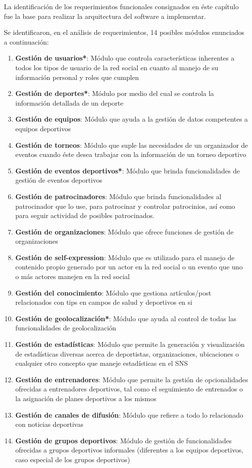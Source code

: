 La identificación de los requerimientos funcionales consignados en éste capítulo fue la base para realizar la arquitectura del software a implementar.

Se identificaron, en el análisis de requerimientos, 14 posibles módulos enunciados a continuación:

\begin{enumerate}
	\item \textbf{Gestión de usuarios*}: Módulo que controla características inherentes a todos los tipos de usuario de la red social en cuanto al manejo de su información personal y roles que cumplen
	\item \textbf{Gestión de deportes*}: Módulo por medio del cual se controla la información detallada de un deporte
	\item \textbf{Gestión de equipos}: Módulo que ayuda a la gestión de datos competentes a equipos deportivos
	\item \textbf{Gestión de torneos}: Módulo que suple las necesidades de un organizador de eventos cuando éste desea trabajar con la información de un torneo deportivo
	\item \textbf{Gestión de eventos deportivos*}: Módulo que brinda funcionalidades de gestión de eventos deportivos
	\item \textbf{Gestión de patrocinadores}: Módulo que brinda funcionalidades al patrocinador que lo use, para patrocinar y controlar patrocinios, así como para seguir actividad de posibles patrocinados.
	\item \textbf{Gestión de organizaciones}: Módulo que ofrece funciones de gestión de organizaciones
	\item \textbf{Gestión de self-expression}: Módulo que es utilizado para el manejo de contenido propio generado por un actor en la red social o un evento que uno o más actores manejen en la red social
	\item \textbf{Gestión del conocimiento}: Módulo que gestiona artículos/post relacionados con tips en campos de salud y deportivos en si
	\item \textbf{Gestión de geolocalización*}: Módulo que ayuda al control de todas las funcionalidades de geolocalización
	\item \textbf{Gestión de estadísticas}: Módulo que permite la generación y visualización de estadísticas diversas acerca de deportistas, organizaciones, ubicaciones o cualquier otro concepto que maneje estadísticas en el SNS
	\item \textbf{Gestión de entrenadores}: Módulo que permite la gestión de opcionalidades ofrecidas a entrenadores deportivos, tal como el seguimiento de entrenados o la asignación de planes deportivos a los mismos
	\item \textbf{Gestión de canales de difusión}: Módulo que refiere a todo lo relacionado con noticias deportivas
	\item \textbf{Gestión de grupos deportivos}:  Módulo de gestión de funcionalidades ofrecidas a grupos deportivos informales (diferentes a los equipos deportivos, caso especial de los grupos deportivos)
\end{enumerate}

